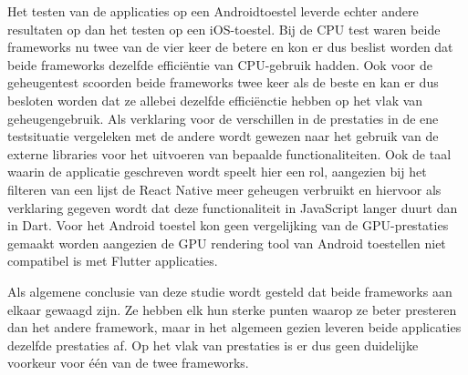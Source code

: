 Het testen van de applicaties op een Androidtoestel leverde echter andere resultaten op dan het testen op een iOS-toestel. Bij de CPU test waren beide frameworks nu twee van de vier keer de betere en kon er dus beslist worden dat beide frameworks dezelfde efficiëntie van CPU-gebruik hadden. Ook voor de geheugentest scoorden beide frameworks twee keer als de beste en kan er dus besloten worden dat ze allebei dezelfde efficiënctie hebben op het vlak van geheugengebruik. Als verklaring voor de verschillen in de prestaties in de ene testsituatie vergeleken met de andere wordt gewezen naar het gebruik van de externe libraries voor het uitvoeren van bepaalde functionaliteiten. Ook de taal waarin de applicatie geschreven wordt speelt hier een rol, aangezien bij het filteren van een lijst de React Native meer geheugen verbruikt en hiervoor als verklaring gegeven wordt dat deze functionaliteit in JavaScript langer duurt dan in Dart. Voor het Android toestel kon geen vergelijking van de GPU-prestaties gemaakt worden aangezien de GPU rendering tool van Android toestellen niet compatibel is met Flutter applicaties.

Als algemene conclusie van deze studie wordt gesteld dat beide frameworks aan elkaar gewaagd zijn. Ze hebben elk hun sterke punten waarop ze beter presteren dan het andere framework, maar in het algemeen gezien leveren beide applicaties dezelfde prestaties af. Op het vlak van prestaties is er dus geen duidelijke voorkeur voor één van de twee frameworks. 


